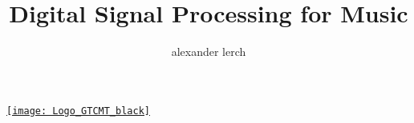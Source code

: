 \title[]{Digital Signal Processing for Music}   
\author[alexander lerch]{alexander lerch} 


\begin{frame}
    \titlepage
    \begin{flushright}
        \href{http://www.gtcmt.gatech.edu}{\texttt{[image: Logo\_GTCMT\_black]}}
    \end{flushright}
\end{frame}
